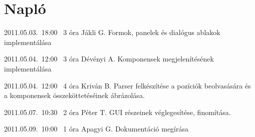 %
\section{Napló}

\begin{naplo}

\bejegyzes
{2011.05.03.~18:00~} %
{3 óra} %
{Jákli G.} %
{Formok, panelek és dialógus ablakok implementálása} %

\bejegyzes
{2011.05.04.~12:00~}
{3 óra}
{Dévényi A.}
{Komponensek megjelenítésének implementálása}

\bejegyzes
{2011.05.04.~12:00~}
{4 óra}
{Kriván B.}
{Parser felkészítése a pozíciók beolvasására és a komponensek összeköttetéséinek ábrázolása.}

\bejegyzes
{2011.05.07.~10:30~}
{2 óra}
{Péter T.}
{GUI részeinek véglegesítése, finomítása.}

\bejegyzes
{2011.05.09.~10:00~}
{1 óra}
{Apagyi G.}
{Dokumentáció megírása}

\end{naplo}

